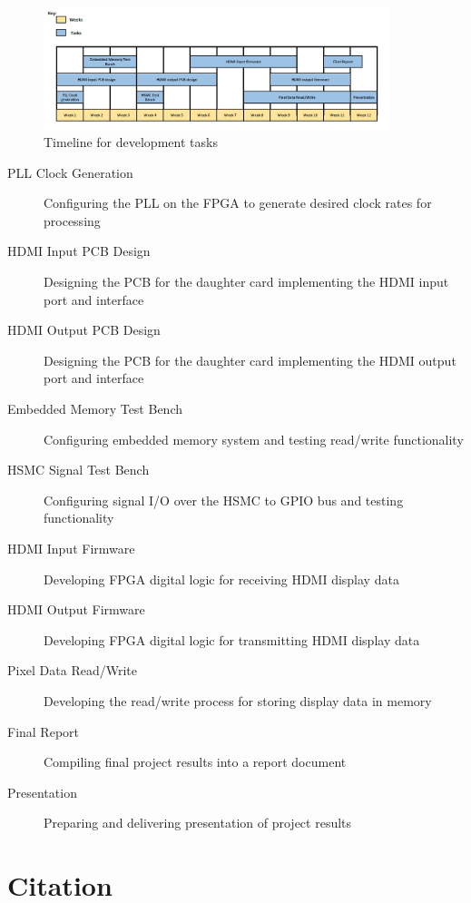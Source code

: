 \documentclass[12pt]{article}
\begin{document}
\begin{figure}[H]
\centering
\includegraphics[width=0.9\textwidth]{Timeline.jpg}
\caption{Timeline for development tasks}
\label{fig:timeline}
\end{figure}

\begin{description}
\item[PLL Clock Generation] Configuring the PLL on the FPGA to generate desired clock rates for processing
\item[HDMI Input PCB Design] Designing the PCB for the daughter card implementing the HDMI input port and interface
\item[HDMI Output PCB Design] Designing the PCB for the daughter card implementing the HDMI output port and interface
\item[Embedded Memory Test Bench] Configuring embedded memory system and testing read/write functionality
\item[HSMC Signal Test Bench] Configuring signal I/O over the HSMC to GPIO bus and testing functionality
\item[HDMI Input Firmware] Developing FPGA digital logic for receiving HDMI display data
\item[HDMI Output Firmware] Developing FPGA digital logic for transmitting HDMI display data
\item[Pixel Data Read/Write] Developing the read/write process for storing display data in memory
\item[Final Report] Compiling final project results into a report document
\item[Presentation] Preparing and delivering presentation of project results
\end{description}

\section{Citation}


\end{document}
